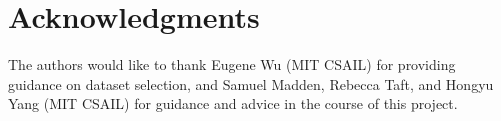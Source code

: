 \section{Acknowledgments}
The authors would like to thank Eugene Wu (MIT CSAIL) for providing guidance on dataset selection, and Samuel Madden, Rebecca Taft, and Hongyu Yang (MIT CSAIL) for guidance and advice in the course of this project.
